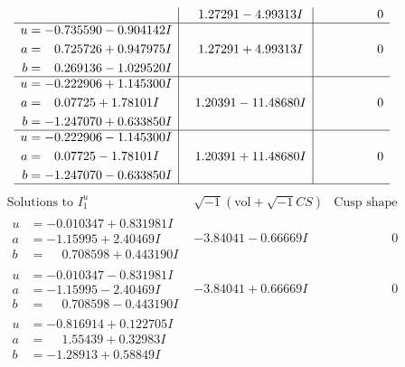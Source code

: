 \documentclass[1p]{elsarticle_modified}
\theoremstyle{definition}
\newcommand{\I}{\sqrt{-1}}
\begin{document}
$$\begin{array}{c|c|c}
 & \phantom{-}1.27291 - 4.99313 I & \phantom{-0.000000 } 0 \\ \hline\begin{aligned}
u &= -0.735590 - 0.904142 I \\
a &= \phantom{-}0.725726 + 0.947975 I \\
b &= \phantom{-}0.269136 - 1.029520 I\end{aligned}
 & \phantom{-}1.27291 + 4.99313 I & \phantom{-0.000000 } 0 \\ \hline\begin{aligned}
u &= -0.222906 + 1.145300 I \\
a &= \phantom{-}0.07725 + 1.78101 I \\
b &= -1.247070 + 0.633850 I\end{aligned}
 & \phantom{-}1.20391 - 11.48680 I & \phantom{-0.000000 } 0 \\ \hline\begin{aligned}
u &= -0.222906 - 1.145300 I \\
a &= \phantom{-}0.07725 - 1.78101 I \\
b &= -1.247070 - 0.633850 I\end{aligned}
 & \phantom{-}1.20391 + 11.48680 I & \phantom{-0.000000 } 0\\
 \hline 
 \end{array}$$\newpage$$\begin{array}{c|c|c}  
\text{Solutions to }I^u_{1}& \I (\text{vol} + \sqrt{-1}CS) & \text{Cusp shape}\\
 \hline 
\begin{aligned}
u &= -0.010347 + 0.831981 I \\
a &= -1.15995 + 2.40469 I \\
b &= \phantom{-}0.708598 + 0.443190 I\end{aligned}
 & -3.84041 - 0.66669 I & \phantom{-0.000000 } 0 \\ \hline\begin{aligned}
u &= -0.010347 - 0.831981 I \\
a &= -1.15995 - 2.40469 I \\
b &= \phantom{-}0.708598 - 0.443190 I\end{aligned}
 & -3.84041 + 0.66669 I & \phantom{-0.000000 } 0 \\ \hline\begin{aligned}
u &= -0.816914 + 0.122705 I \\
a &= \phantom{-}1.55439 + 0.32983 I \\
b &= -1.28913 + 0.58849 I\end{aligned}

\end{array}$$
\end{document}
